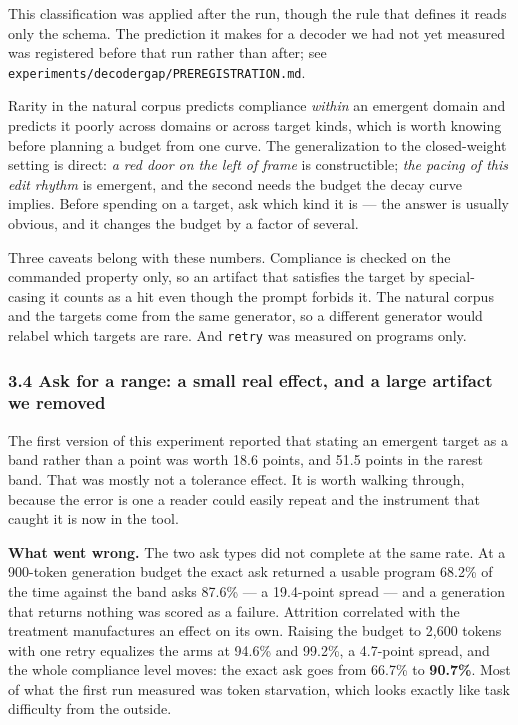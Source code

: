 \documentclass[
  10pt,
]{article}
\theoremstyle{plain}
\theoremstyle{definition}
\begin{document}
This classification was applied after the run, though the rule that
defines it reads only the schema. The prediction it makes for a decoder
we had not yet measured was registered before that run rather than
after; see \texttt{experiments/decodergap/PREREGISTRATION.md}.

Rarity in the natural corpus predicts compliance \emph{within} an
emergent domain and predicts it poorly across domains or across target
kinds, which is worth knowing before planning a budget from one curve.
The generalization to the closed-weight setting is direct: \emph{a red
door on the left of frame} is constructible; \emph{the pacing of this
edit rhythm} is emergent, and the second needs the budget the decay
curve implies. Before spending on a target, ask which kind it is --- the
answer is usually obvious, and it changes the budget by a factor of
several.

Three caveats belong with these numbers. Compliance is checked on the
commanded property only, so an artifact that satisfies the target by
special-casing it counts as a hit even though the prompt forbids it. The
natural corpus and the targets come from the same generator, so a
different generator would relabel which targets are rare. And
\texttt{retry} was measured on programs only.

\subsubsection{3.4 Ask for a range: a small real effect, and a large
artifact we
removed}\label{34-ask-for-a-range-a-small-real-effect-and-a-large-artifact-we-removed}

The first version of this experiment reported that stating an emergent
target as a band rather than a point was worth 18.6 points, and 51.5
points in the rarest band. That was mostly not a tolerance effect. It is
worth walking through, because the error is one a reader could easily
repeat and the instrument that caught it is now in the tool.

\textbf{What went wrong.} The two ask types did not complete at the same
rate. At a 900-token generation budget the exact ask returned a usable
program 68.2\% of the time against the band ask\textquotesingle s 87.6\%
--- a 19.4-point spread --- and a generation that returns nothing was
scored as a failure. Attrition correlated with the treatment
manufactures an effect on its own. Raising the budget to 2,600 tokens
with one retry equalizes the arms at 94.6\% and 99.2\%, a 4.7-point
spread, and the whole compliance level moves: the exact ask goes from
66.7\% to \textbf{90.7\%}. Most of what the first run measured was token
starvation, which looks exactly like task difficulty from the outside.
\end{document}
